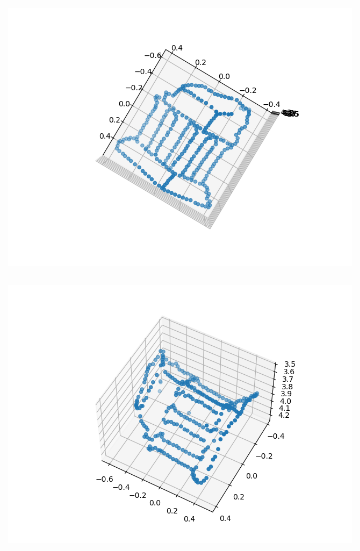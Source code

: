 \documentclass{article} %
\begin{document}
    \begin{figure}[h]
        \begin{subfigure}[b]{0.5\textwidth}
            \includegraphics[width=\textwidth]{q4,2_1.png}
        \end{subfigure}
        \begin{subfigure}[b]{0.5\textwidth}
            \includegraphics[width=\textwidth]{q4,2_2.png}
        \end{subfigure}
        \begin{subfigure}[b]{0.5\textwidth}

\end{subfigure}
\end{figure}
\end{document}

